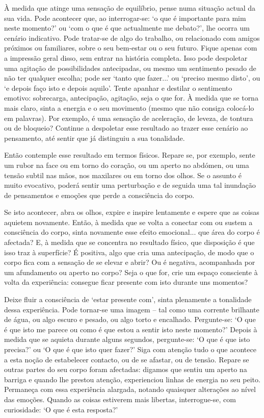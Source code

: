 À medida que atinge uma sensação de equilíbrio, pense numa situação actual da sua vida. Pode acontecer que, ao interrogar-se: `o que é importante para mim neste momento?' ou `com o que é que actualmente me debato?', lhe ocorra um cenário indicativo. Pode tratar-se de algo do trabalho, ou relacionado com amigos próximos ou familiares, sobre o seu bem-estar ou o seu futuro. Fique apenas com a impressão geral disso, sem entrar na história completa. Isso pode despoletar uma agitação de possibilidades antecipadas, ou mesmo um sentimento pesado de não ter qualquer escolha; pode ser `tanto que fazer...' ou `preciso mesmo disto', ou `e depois faço isto e depois aquilo'. Tente apanhar e destilar o sentimento emotivo: sobrecarga, antecipação, agitação, seja o que for. À medida que se torna mais claro, sinta a energia e o seu movimento (mesmo que não consiga colocá-lo em palavras). Por exemplo, é uma sensação de aceleração, de leveza, de tontura ou de bloqueio? Continue a despoletar esse resultado ao trazer esse cenário ao pensamento, até sentir que já distinguiu a sua tonalidade.

Então contemple esse resultado em termos físicos. Repare se, por exemplo, sente um rubor na face ou em torno do coração, ou um aperto no abdómen, ou uma tensão subtil nas mãos, nos maxilares ou em torno dos olhos. Se o assunto é muito evocativo, poderá sentir uma perturbação e de seguida uma tal inundação de pensamentos e emoções que perde a consciência do corpo.

Se isto acontecer, abra os olhos, expire e inspire lentamente e espere que as coisas aquietem novamente. Então, à medida que se volta a conectar com ou sustem a consciência do corpo, sinta novamente esse efeito emocional... que área do corpo é afectada? E, à medida que se concentra no resultado físico, que disposição é que isso traz à superfície? É positiva, algo que cria uma antecipação, de modo que o corpo fica com a sensação de se elevar e abrir? Ou é negativa, acompanhada por um afundamento ou aperto no corpo? Seja o que for, crie um espaço consciente à volta da experiência: consegue ficar presente com isto durante uns momentos?

Deixe fluir a consciência de `estar presente com', sinta plenamente a tonalidade dessa experiência. Pode tornar-se uma imagem -- tal como uma corrente brilhante de água, ou algo escuro e pesado, ou algo torto e encalhado. Pergunte-se: `O que é que isto me parece ou como é que estou a sentir isto neste momento?' Depois à medida que se aquieta durante alguns segundos, pergunte-se: `O que é que isto precisa?' ou `O que é que isto quer fazer?' Siga com atenção tudo o que acontece a esta noção de estabelecer contacto, ou de se afastar, ou de tensão. Repare se outras partes do seu corpo foram afectadas: digamos que sentiu um aperto na barriga e quando lhe prestou atenção, experienciou linhas de energia no seu peito. Permaneça com essa experiência alargada, notando quaisquer alterações ao nível das emoções. Quando as coisas estiverem mais libertas, interrogue-se, com curiosidade: `O que é esta resposta?'

